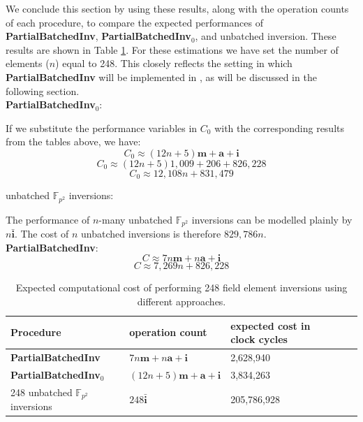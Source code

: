 We conclude this section by using these results, along with the operation counts of each procedure, to compare the expected performances of \textbf{PartialBatchedInv}, \textbf{PartialBatchedInv}$_0$, and unbatched inversion. These results are shown in Table \ref{tab:compareprocs}. For these estimations we have set the number of elements ($n$) equal to 248. This closely reflects the setting in which \textbf{PartialBatchedInv} will be implemented in \sidh, as will be discussed in the following section.\\

\noindent
\textbf{PartialBatchedInv}$_0$:

	If we substitute the performance variables in $C_0$ with the corresponding results from the tables above, we have:
$$
C_0 \approx (12n + 5)\textbf{m} + \textbf{a} + \textbf{i}
$$
$$
C_0 \approx (12n + 5)1,009 + 206 + 826,228
$$
$$
C_0 \approx 12,108n + 831,479
$$

\noindent
unbatched $\mathbb{F}_{p^2}$ inversions:

	The performance of $n$-many unbatched $\mathbb{F}_{p^2}$ inversions can be modelled plainly by $n\bar{\textbf{i}}$. The cost of $n$ unbatched inversions is therefore $829,786n$.\\

\noindent
\textbf{PartialBatchedInv}:
$$
C \approx 7n\textbf{m} + n\textbf{a} + \textbf{i}
$$
$$
C \approx 7,269n + 826,228
$$

\begin{table}[!h]
\begin{center}
\begin{tabular}{lllll}
	\toprule
	Procedure & operation count & expected cost in clock cycles\\
	\midrule
	\textbf{PartialBatchedInv} & $7n\textbf{m} + n\textbf{a} + \textbf{i}$ & 2,628,940\\
	\textbf{PartialBatchedInv}$_0$ & $(12n + 5)\textbf{m} + \textbf{a} + \textbf{i}$ & 3,834,263\\
	248 unbatched $\mathbb{F}_{p^2}$ inversions & $248\bar{\textbf{i}}$ & 205,786,928\\
	\bottomrule
\end{tabular}
\end{center}
\caption{Expected computational cost of performing 248 field element inversions using different approaches.}
\label{tab:compareprocs}
\end{table}

